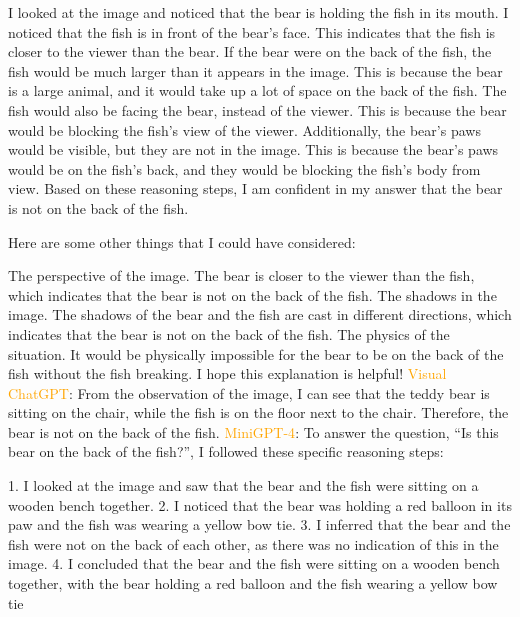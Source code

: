 \begin{enumerate}
        I looked at the image and noticed that the bear is holding the fish in its mouth.
        I noticed that the fish is in front of the bear's face. This indicates that the fish is closer to the viewer than the bear.
        If the bear were on the back of the fish, the fish would be much larger than it appears in the image. This is because the bear is a large animal, and it would take up a lot of space on the back of the fish.
        The fish would also be facing the bear, instead of the viewer. This is because the bear would be blocking the fish's view of the viewer.
        Additionally, the bear's paws would be visible, but they are not in the image. This is because the bear's paws would be on the fish's back, and they would be blocking the fish's body from view.
        Based on these reasoning steps, I am confident in my answer that the bear is not on the back of the fish.
        
        Here are some other things that I could have considered:
        
        The perspective of the image. The bear is closer to the viewer than the fish, which indicates that the bear is not on the back of the fish.
        The shadows in the image. The shadows of the bear and the fish are cast in different directions, which indicates that the bear is not on the back of the fish.
        The physics of the situation. It would be physically impossible for the bear to be on the back of the fish without the fish breaking.
        I hope this explanation is helpful!
        \subitem \textcolor{orange}{Visual ChatGPT}: From the observation of the image, I can see that the teddy bear is sitting on the chair, while the fish is on the floor next to the chair. Therefore, the bear is not on the back of the fish.
        \subitem \textcolor{orange}{MiniGPT-4}: To answer the question, “Is this bear on the back of the fish?”, I followed these specific reasoning steps:

        1. I looked at the image and saw that the bear and the fish were sitting on a wooden bench together.
        2. I noticed that the bear was holding a red balloon in its paw and the fish was wearing a yellow bow tie.
        3. I inferred that the bear and the fish were not on the back of each other, as there was no indication of this in the image.
        4. I concluded that the bear and the fish were sitting on a wooden bench together, with the bear holding a red balloon and the fish wearing a yellow bow tie
    \end{enumerate}
